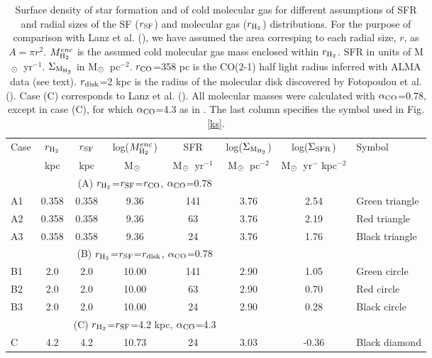 \documentclass{aa}
\newcommand{\msun}{M$_{\rm \odot}$~}
\begin{document}
\begin{table*}
\centering
\begin{tabular}{lccccccl}
\hline
Case & $r_{\rm H_2}$  & $r_{\rm SF}$ & log($M_{\rm H_2}^{enc}$) & SFR &  log($\Sigma_{\rm M_{H_2}}$) & log($\Sigma_{\rm SFR}$) & Symbol \\ 
 &	 kpc &	 kpc & \msun & \msun yr$^{-1}$  & \msun pc$^{-2}$ & \msun yr$^{-}$ kpc$^{-2}$ & \\
\hline
  &  & \multicolumn{3}{c}{(A) $r_{\rm H_2}$=$r_{\rm SF}$=$r_{\rm CO}$, $\alpha_{\rm CO}$=0.78 }&    \\
A1 &		0.358 & 	0.358 &   9.36 &  141 & 3.76 & 2.54  & Green triangle \\
A2 & 	0.358 &	0.358 & 9.36	 &   63 & 3.76 & 2.19 & Red triangle\\
A3 &	0.358 &	0.358 & 9.36	 &   24 & 3.76 & 1.76 & Black triangle\\ 
 &  & \multicolumn{3}{c}{(B) $r_{\rm H_2}$=$r_{\rm SF}$=$r_{\rm disk}$, $\alpha_{\rm CO}$=0.78 }&    \\
B1 &	2.0 &	2.0 & 10.00	&   141  & 2.90 & 1.05  & Green circle\\
B2 &	2.0 &	2.0 & 10.00	&   63  &  2.90 & 0.70  & Red circle \\
B3 &	2.0 &	2.0 & 10.00	&   24  & 2.90 & 0.28  & Black circle\\
&  & \multicolumn{3}{c}{(C) $r_{\rm H_2}$=$r_{\rm SF}$=4.2 kpc, $\alpha_{\rm CO}$=4.3}&    \\
C & 4.2	 &  4.2	 &  10.73 & 24 & 3.03 & -0.36  & Black  diamond\\ \hline
\end{tabular}	
\caption{Surface density of star formation and of cold molecular gas for different assumptions of SFR and radial sizes of the SF ($r_{\rm SF}$) and molecular gas ($r_{\rm H_2}$) distributions.  For the purpose of comparison with Lanz et al. (\citeyear{Lanz2016}), we have assumed the area corresping to each radial size, $r$,  as $A = \pi r^2$.    $M_{\rm H_2}^{enc}$ is the assumed cold molecular gas mass enclosed within $r_{\rm H_2}$.  SFR in units of \msun yr$^{-1}$. $\Sigma_{\rm M_{H_2}}$ in  \msun pc$^{-2}$. $r_{\rm CO}$=358 pc  is the CO(2-1)  half light radius inferred with ALMA data (see text). $r_{\rm disk}$=2 kpc is the radius of the molecular disk discovered by Fotopoulou et al. (\citeyear{Fotopoulou2019}). Case (C) corresponds to  Lanz et al. (\citeyear{Lanz2016}). All molecular masses were calculated with $\alpha_{\rm CO}$=0.78, except  in case (C), for which $\alpha_{\rm CO}$=4.3 as in \cite{Lanz2016}. The last column specifies the symbol used in Fig. \ref{ks}.} 
\label{supr}
\end{table*}
\end{document}
